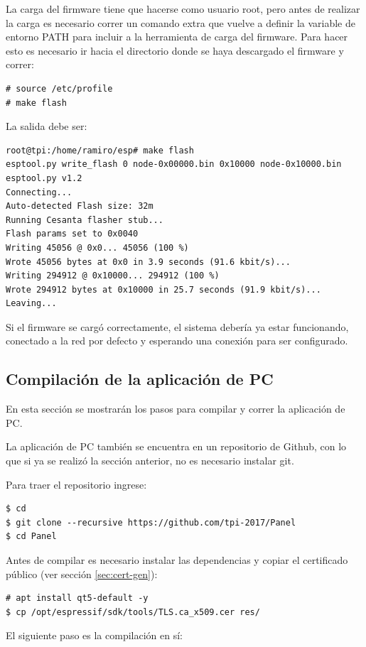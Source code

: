 La carga del firmware tiene que hacerse como usuario root, pero antes de realizar la carga es necesario correr un comando extra que vuelve a definir la variable de entorno PATH para incluir a la herramienta de carga del firmware.
Para hacer esto es necesario ir hacia el directorio donde se haya descargado el firmware y correr:
\begin{lstlisting}
# source /etc/profile
# make flash
\end{lstlisting}

La salida debe ser:
\begin{lstlisting}
root@tpi:/home/ramiro/esp# make flash
esptool.py write_flash 0 node-0x00000.bin 0x10000 node-0x10000.bin
esptool.py v1.2
Connecting...
Auto-detected Flash size: 32m
Running Cesanta flasher stub...
Flash params set to 0x0040
Writing 45056 @ 0x0... 45056 (100 %)
Wrote 45056 bytes at 0x0 in 3.9 seconds (91.6 kbit/s)...
Writing 294912 @ 0x10000... 294912 (100 %)
Wrote 294912 bytes at 0x10000 in 25.7 seconds (91.9 kbit/s)...
Leaving...
\end{lstlisting}

Si el firmware se cargó correctamente, el sistema debería ya estar funcionando, conectado a la red por defecto y esperando una conexión para ser configurado.

\subsection{Compilación de la aplicación de PC}
En esta sección se mostrarán los pasos para compilar y correr la aplicación de PC.

La aplicación de PC también se encuentra en un repositorio de Github, con lo que si ya se realizó la sección anterior, no es necesario instalar git.

Para traer el repositorio ingrese:
\begin{lstlisting}
$ cd
$ git clone --recursive https://github.com/tpi-2017/Panel
$ cd Panel
\end{lstlisting}

Antes de compilar es necesario instalar las dependencias y copiar el certificado público (ver sección \ref{sec:cert-gen}):

\begin{lstlisting}
# apt install qt5-default -y
$ cp /opt/espressif/sdk/tools/TLS.ca_x509.cer res/
\end{lstlisting}

El siguiente paso es la compilación en sí:

